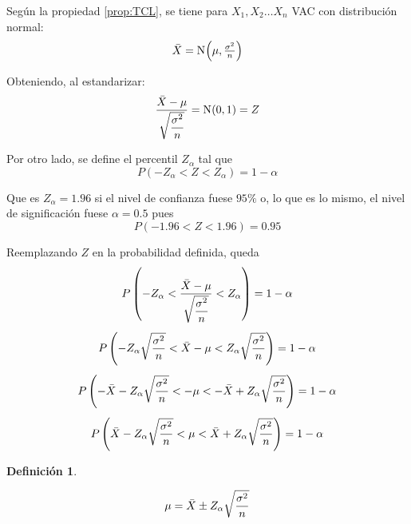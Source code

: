 \documentclass[a5paper,12pt,twoside]{book}
\newtheorem{defn}{{Definición}}[chapter]
\begin{document}
Según la propiedad \ref{prop:TCL}, se tiene para $X_1, X_2 \dots X_n$ VAC con distribución normal:
\begin{equation*}
    \ave{X} = \fx[\nor]{\mu, \tfrac{\sigma^2}{n}}
\end{equation*}

Obteniendo, al estandarizar:
\begin{equation*}
    \frac{\ave{X}-\mu}{\sqrt{\dfrac{\sigma^2}{n}}} = \fx[\nor]{0,1} = Z
\end{equation*}

Por otro lado, se define el percentil $Z_\alpha$ tal que
\begin{equation*}
    P(-Z_\alpha<Z<Z_\alpha) = 1 - \alpha
\end{equation*}

Que es $Z_\alpha=1.96$ si el nivel de confianza fuese $95\%$ o, lo que es lo mismo, el nivel de significación fuese $\alpha=0.5$ pues
\begin{equation*}
    P(-1.96<Z<1.96) = 0.95
\end{equation*}

Reemplazando $Z$ en la probabilidad definida, queda
\begin{gather*}
    P \inParentheses{ -Z_\alpha < \frac{\ave{X}-\mu}{\sqrt{\dfrac{\sigma^2}{n}}} < Z_\alpha } = 1 - \alpha
    \\[1ex]
    P \inParentheses{ - Z_\alpha \sqrt{\frac{\sigma^2}{n}} < \ave{X} - \mu < Z_\alpha \sqrt{\frac{\sigma^2}{n}} } = 1 - \alpha
    \\[1ex]
    P \inParentheses{ - \ave{X} - Z_\alpha \sqrt{\frac{\sigma^2}{n}} < -\mu < - \ave{X} + Z_\alpha \sqrt{\frac{\sigma^2}{n}} } = 1 - \alpha
    \\[1ex]
    P \inParentheses{ \ave{X} - Z_\alpha \sqrt{\frac{\sigma^2}{n}} < \mu < \ave{X} + Z_\alpha \sqrt{\frac{\sigma^2}{n}} } = 1 - \alpha
\end{gather*}

\begin{mdframed}[style=DefinitionFrame]
    \begin{defn}
    \end{defn}
    \begin{equation*}
        \mu = \ave{X} \pm Z_\alpha \sqrt{\frac{\sigma^2}{n}}
    \end{equation*}
\end{mdframed}
\end{document}
